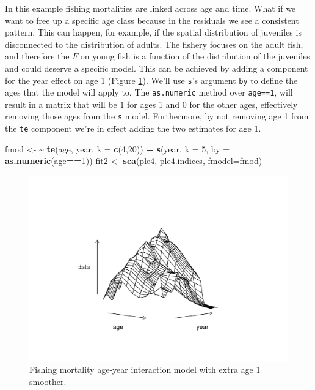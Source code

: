 \documentclass[
]{book}
\newenvironment{Shaded}{\begin{snugshade}}{\end{snugshade}}
\newcommand{\AttributeTok}[1]{\textcolor[rgb]{0.13,0.29,0.53}{#1}}
\newcommand{\DecValTok}[1]{\textcolor[rgb]{0.00,0.00,0.81}{#1}}
\newcommand{\ErrorTok}[1]{\textcolor[rgb]{0.64,0.00,0.00}{\textbf{#1}}}
\newcommand{\FunctionTok}[1]{\textcolor[rgb]{0.13,0.29,0.53}{\textbf{#1}}}
\newcommand{\NormalTok}[1]{#1}
\newcommand{\OtherTok}[1]{\textcolor[rgb]{0.56,0.35,0.01}{#1}}
\newcommand{\SpecialCharTok}[1]{\textcolor[rgb]{0.81,0.36,0.00}{\textbf{#1}}}
\begin{document}
In this example fishing mortalities are linked across age and time. What if we want to free up a specific age class because in the residuals we see a consistent pattern. This can happen, for example, if the spatial distribution of juveniles is disconnected to the distribution of adults. The fishery focuses on the adult fish, and therefore the \(F\) on young fish is a function of the distribution of the juveniles and could deserve a specific model. This can be achieved by adding a component for the year effect on age 1 (Figure \ref{fig:age1}). We'll use \texttt{s}'s argument \texttt{by} to define the ages that the model will apply to. The \texttt{as.numeric} method over \texttt{age==1}, will result in a matrix that will be \(1\) for ages 1 and \(0\) for the other ages, effectively removing those ages from the \texttt{s} model. Furthermore, by not removing age 1 from the \texttt{te} component we're in effect adding the two estimates for age 1.

\begin{Shaded}
\begin{Highlighting}[]
\NormalTok{fmod }\OtherTok{\textless{}{-}} \ErrorTok{\textasciitilde{}} \FunctionTok{te}\NormalTok{(age, year, }\AttributeTok{k =} \FunctionTok{c}\NormalTok{(}\DecValTok{4}\NormalTok{,}\DecValTok{20}\NormalTok{)) }\SpecialCharTok{+} \FunctionTok{s}\NormalTok{(year, }\AttributeTok{k =} \DecValTok{5}\NormalTok{, }\AttributeTok{by =} \FunctionTok{as.numeric}\NormalTok{(age}\SpecialCharTok{==}\DecValTok{1}\NormalTok{))}
\NormalTok{fit2 }\OtherTok{\textless{}{-}} \FunctionTok{sca}\NormalTok{(ple4, ple4.indices, }\AttributeTok{fmodel=}\NormalTok{fmod)}
\end{Highlighting}
\end{Shaded}

\begin{figure}
\centering
\includegraphics{_bookdown_files/_main_files/figure-html/age1-1.png}
\caption{\label{fig:age1}Fishing mortality age-year interaction model with extra age 1 smoother.}
\end{figure}
\end{document}
